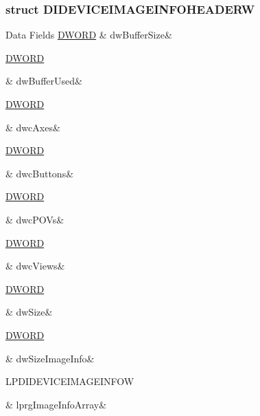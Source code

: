 \subsubsection{struct D\-I\-D\-E\-V\-I\-C\-E\-I\-M\-A\-G\-E\-I\-N\-F\-O\-H\-E\-A\-D\-E\-R\-W}
\begin{DoxyFields}{Data Fields}
\hypertarget{a00003_a92761eecb6910f4a437a95dd14171e93}{\hyperlink{a00003_a50e15ae51c87ae06ab29c8148cb5f36c}{D\-W\-O\-R\-D}}\label{a00003_a92761eecb6910f4a437a95dd14171e93}
&
dw\-Buffer\-Size&
\\
\hline

\hypertarget{a00003_a5fae77947eea6616926c56173eae3549}{\hyperlink{a00003_a50e15ae51c87ae06ab29c8148cb5f36c}{D\-W\-O\-R\-D}}\label{a00003_a5fae77947eea6616926c56173eae3549}
&
dw\-Buffer\-Used&
\\
\hline

\hypertarget{a00003_a85c21dab24dee8887fd741afbd1e1db6}{\hyperlink{a00003_a50e15ae51c87ae06ab29c8148cb5f36c}{D\-W\-O\-R\-D}}\label{a00003_a85c21dab24dee8887fd741afbd1e1db6}
&
dwc\-Axes&
\\
\hline

\hypertarget{a00003_a370c2f68f567c505f12fe1b02197c12b}{\hyperlink{a00003_a50e15ae51c87ae06ab29c8148cb5f36c}{D\-W\-O\-R\-D}}\label{a00003_a370c2f68f567c505f12fe1b02197c12b}
&
dwc\-Buttons&
\\
\hline

\hypertarget{a00003_a000038d6e7a4d9cd793760b89ee1c39c}{\hyperlink{a00003_a50e15ae51c87ae06ab29c8148cb5f36c}{D\-W\-O\-R\-D}}\label{a00003_a000038d6e7a4d9cd793760b89ee1c39c}
&
dwc\-P\-O\-Vs&
\\
\hline

\hypertarget{a00003_ae2e8ee016fee31367b976fa7f2a8833a}{\hyperlink{a00003_a50e15ae51c87ae06ab29c8148cb5f36c}{D\-W\-O\-R\-D}}\label{a00003_ae2e8ee016fee31367b976fa7f2a8833a}
&
dwc\-Views&
\\
\hline

\hypertarget{a00003_a669c5a85f5a9eb97e64ad880fadaaa2d}{\hyperlink{a00003_a50e15ae51c87ae06ab29c8148cb5f36c}{D\-W\-O\-R\-D}}\label{a00003_a669c5a85f5a9eb97e64ad880fadaaa2d}
&
dw\-Size&
\\
\hline

\hypertarget{a00003_abcc2947953dfdc55eae93c9d01cca1c7}{\hyperlink{a00003_a50e15ae51c87ae06ab29c8148cb5f36c}{D\-W\-O\-R\-D}}\label{a00003_abcc2947953dfdc55eae93c9d01cca1c7}
&
dw\-Size\-Image\-Info&
\\
\hline

\hypertarget{a00003_ae333ee6b3c19afc396124f8e91c50678}{L\-P\-D\-I\-D\-E\-V\-I\-C\-E\-I\-M\-A\-G\-E\-I\-N\-F\-O\-W}\label{a00003_ae333ee6b3c19afc396124f8e91c50678}
&
lprg\-Image\-Info\-Array&
\\
\hline

\end{DoxyFields}
\label{d0/d89/a00071}
\hypertarget{a00003_d0/d89/a00071}{}
